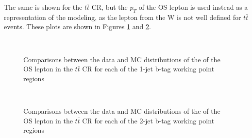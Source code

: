The same is shown for the $t\bar{t}$ CR, but the $p_T$ of the OS lepton is used instead as a representation of the modeling, as the lepton from the W is not well defined for $t\bar{t}$ events. These plots are shown in Figures \ref{fig:ttbar_pt0_1j} and \ref{fig:ttbar_pt0_2j}.

\begin{figure}[H]
    \centering
    \\
    \caption{Comparisons between the data and MC distributions of the \pt of the OS lepton in the $t\bar{t}$ CR for each of the 1-jet b-tag working point regions}
   \label{fig:ttbar_pt0_1j}
\end{figure}                                                                                                                 
 
\begin{figure}[H]                                                                                                            
    \centering
    \\
    \caption{Comparisons between the data and MC distributions of the \pt of the OS lepton in the $t\bar{t}$ CR for each of the 2-jet b-tag working point regions}
   \label{fig:ttbar_pt0_2j}
\end{figure}
